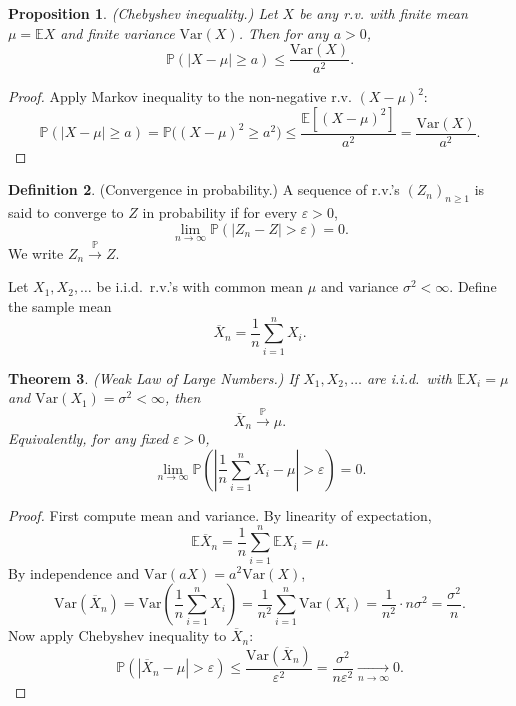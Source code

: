 \documentclass[11pt]{article}
\theoremstyle{plain}
\newtheorem{theorem}{Theorem}[section]
\newtheorem{proposition}[theorem]{Proposition}
\theoremstyle{definition}
\newtheorem{definition}[theorem]{Definition}
\theoremstyle{remark}
\begin{document}
\begin{proposition}
	(Chebyshev inequality.)
	Let \(X\) be any r.v. with finite mean \(\mu=\mathbb{E}X\) and finite variance \(\mathrm{Var}(X)\).
	Then for any \(a>0\),
	\[
	\mathbb{P}(|X-\mu|\ge a)\le \frac{\mathrm{Var}(X)}{a^2}.
	\]
\end{proposition}

\begin{proof}
	Apply Markov inequality to the non-negative r.v. \((X-\mu)^2\):
	\[
	\mathbb{P}(|X-\mu|\ge a)
	=\mathbb{P}\big((X-\mu)^2\ge a^2\big)
	\le \frac{\mathbb{E}[(X-\mu)^2]}{a^2}
	=\frac{\mathrm{Var}(X)}{a^2}.
	\]
\end{proof}



\begin{definition}
	(Convergence in probability.)
	A sequence of r.v.'s \((Z_n)_{n\ge 1}\) is said to converge to \(Z\) in probability if
	for every \(\varepsilon>0\),
	\[
	\lim_{n\to\infty}\mathbb{P}(|Z_n-Z|>\varepsilon)=0.
	\]
	We write \(Z_n \xrightarrow{\mathbb{P}} Z\).
\end{definition}



Let \(X_1,X_2,\dots\) be i.i.d.\ r.v.'s with common mean \(\mu\) and variance \(\sigma^2<\infty\).
Define the sample mean
\[
\overline{X}_n=\frac{1}{n}\sum_{i=1}^n X_i.
\]

\begin{theorem}
	(Weak Law of Large Numbers.)
	If \(X_1,X_2,\dots\) are i.i.d.\ with \(\mathbb{E}X_i=\mu\) and \(\mathrm{Var}(X_1)=\sigma^2<\infty\),
	then
	\[
	\overline{X}_n \xrightarrow{\mathbb{P}} \mu.
	\]
	Equivalently, for any fixed \(\varepsilon>0\),
	\[
	\lim_{n\to\infty}\mathbb{P}\!\left(\left|\frac{1}{n}\sum_{i=1}^n X_i-\mu\right|>\varepsilon\right)=0.
	\]
\end{theorem}

\begin{proof}
	First compute mean and variance.
	By linearity of expectation,
	\[
	\mathbb{E}\overline{X}_n
	=\frac{1}{n}\sum_{i=1}^n \mathbb{E}X_i
	=\mu.
	\]
	By independence and \(\mathrm{Var}(aX)=a^2\mathrm{Var}(X)\),
	\[
	\mathrm{Var}(\overline{X}_n)
	=\mathrm{Var}\!\left(\frac{1}{n}\sum_{i=1}^n X_i\right)
	=\frac{1}{n^2}\sum_{i=1}^n \mathrm{Var}(X_i)
	=\frac{1}{n^2}\cdot n\sigma^2
	=\frac{\sigma^2}{n}.
	\]
	Now apply Chebyshev inequality to \(\overline{X}_n\):
	\[
	\mathbb{P}(|\overline{X}_n-\mu|>\varepsilon)
	\le \frac{\mathrm{Var}(\overline{X}_n)}{\varepsilon^2}
	=\frac{\sigma^2}{n\varepsilon^2}\xrightarrow[n\to\infty]{}0.
	\]
\end{proof}
\end{document}
